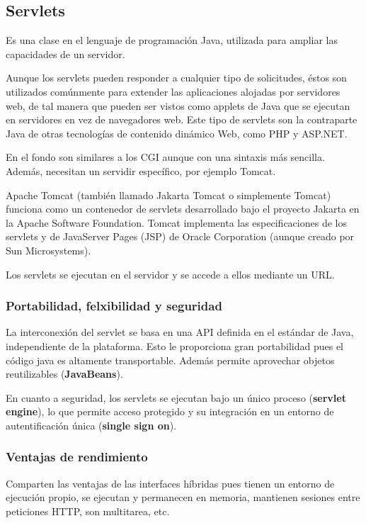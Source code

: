 \documentclass{apuntes}
\begin{document}
\subsection{Servlets}
\begin{defn}[Servlet]
Es una clase en el lenguaje de programación Java, utilizada para ampliar las capacidades de un servidor.
\end{defn}

Aunque los servlets pueden responder a cualquier tipo de solicitudes, éstos son utilizados comúnmente para extender las aplicaciones alojadas por servidores web, de tal manera que pueden ser vistos como applets de Java que se ejecutan en servidores en vez de navegadores web. Este tipo de servlets son la contraparte Java de otras tecnologías de contenido dinámico Web, como PHP y ASP.NET.

En el fondo son similares a los CGI aunque con una sintaxis más sencilla. Además, necesitan un servidir específico, por ejemplo Tomcat.

\begin{defn}[Tomcat]
Apache Tomcat (también llamado Jakarta Tomcat o simplemente Tomcat) funciona como un contenedor de servlets desarrollado bajo el proyecto Jakarta en la Apache Software Foundation. Tomcat implementa las especificaciones de los servlets y de JavaServer Pages (JSP) de Oracle Corporation (aunque creado por Sun Microsystems).
\end{defn}

Los servlets se ejecutan en el servidor y se accede a ellos mediante un URL.

\subsubsection{Portabilidad, felxibilidad y seguridad}
La interconexión del servlet se basa en una API definida en el estándar de Java, independiente de la plataforma. Esto le proporciona gran portabilidad pues el código java es altamente transportable. Además permite aprovechar objetos reutilizables (\textbf{JavaBeans}).

En cuanto a seguridad, los servlets se ejecutan bajo un único proceso (\textbf{servlet engine}), lo que permite acceso protegido y su integración en un entorno de autentificación única (\textbf{single sign on}).

\subsubsection{Ventajas de rendimiento}
Comparten las ventajas de las interfaces híbridas pues tienen un entorno de ejecución propio, se ejecutan y permanecen en memoria, mantienen sesiones entre peticiones HTTP, son multitarea, etc.
\end{document}
